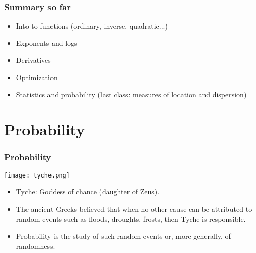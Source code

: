 \documentclass[xcolor=dvipsnames, 9pt]{beamer} %
\begin{document}
\begin{frame}
\frametitle{Summary so far}
\begin{itemize}
\item Into to functions (ordinary, inverse, quadratic...)
\item Exponents and logs 
\item Derivatives 
\item Optimization 
\item Statistics and probability (last class: measures of location and dispersion)
\end{itemize}

\end{frame}



\section{Probability}

\begin{frame}
\frametitle{Probability}
\begin{center}
\texttt{[image: tyche.png]}
\end{center}
\begin{small}
\begin{itemize}
	\setlength\itemsep{1em}
	\item Tyche: Goddess of chance (daughter of Zeus). 
	\item The ancient Greeks believed that when no other cause can be attributed to random events such as floods, droughts, frosts, then Tyche is responsible. 
	\item Probability is the study of such random events or, more generally, of randomness. 
\end{itemize}
\end{small}
\end{frame}
\end{document}
